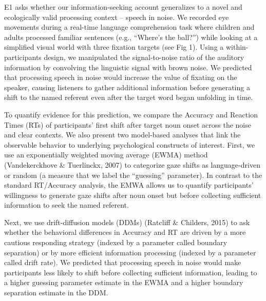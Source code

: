 \documentclass[10pt, letterpaper]{article}
\begin{document}
E1 asks whether our information-seeking account generalizes to a novel
and ecologically valid processing context -- speech in noise. We
recorded eye movements during a real-time language comprehension task
where children and adults processed familiar sentences (e.g., ``Where's
the ball?'') while looking at a simplified visual world with three
fixation targets (see Fig 1). Using a within-participants design, we
manipulated the signal-to-noise ratio of the auditory information by
convolving the linguistic signal with brown noise. We predicted that
processing speech in noise would increase the value of fixating on the
speaker, causing listeners to gather additional information before
generating a shift to the named referent even after the target word
began unfolding in time.

To quantify evidence for this prediction, we compare the Accuracy and
Reaction Times (RTs) of participants' first shift after target noun
onset across the noise and clear contexts. We also present two
model-based analyses that link the observable behavior to underlying
psychological constructs of interest. First, we use an exponentially
weighted moving average (EWMA) method (Vandekerckhove \& Tuerlinckx,
2007) to categorize gaze shifts as language-driven or random (a measure
that we label the ``guessing'' parameter). In contrast to the standard
RT/Accuracy analysis, the EMWA allows us to quantify participants'
willingness to generate gaze shifts after noun onset but before
collecting sufficient information to seek the named referent.

Next, we use drift-diffusion models (DDMs) (Ratcliff \& Childers, 2015)
to ask whether the behavioral differences in Accuracy and RT are driven
by a more cautious responding strategy (indexed by a parameter called
boundary separation) or by more efficient information processing
(indexed by a parameter called drift rate). We predicted that processing
speech in noise would make participants less likely to shift before
collecting sufficient information, leading to a higher guessing
parameter estimate in the EWMA and a higher boundary separation estimate
in the DDM.
\end{document}
